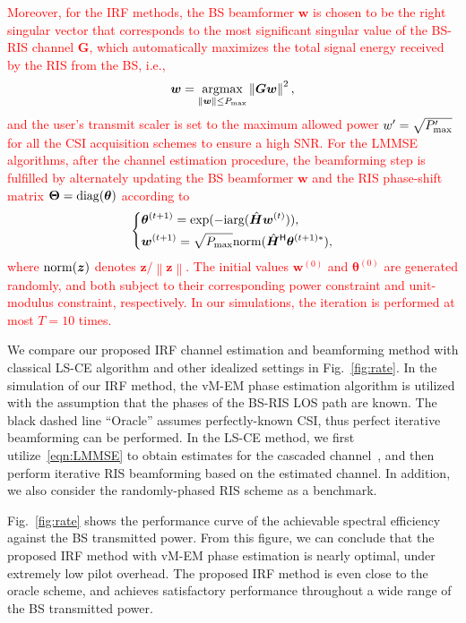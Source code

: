 \documentclass[journal,twocolumn]{IEEEtran}
\theoremstyle{nonumberplain}
\def \exp {\text{exp}}
\def \arg {\text{arg}}
\def \H {^{\mathsf{H}}}
\def \ri {{\rm i}}
\newcommand{\red}[1]{\textcolor{red}{#1}}
\begin{document}
    \red{
    Moreover, for the IRF methods, the BS beamformer $\bm w$ is chosen to be the right singular vector that corresponds to the most significant singular value of the BS-RIS channel $\bm G$, which automatically maximizes the total signal energy received by the RIS from the BS, i.e., 
    \begin{equation}
        {\bm w} = \underset{\left\|{\bm w}\right\|\leq P_{\rm max}}{\rm argmax}\left\|{\bm G}{\bm w} \right\|^2,
    \end{equation}
    and the user's transmit scaler is set to the maximum allowed power $w'=\sqrt{P'_{\rm max}}$ for all the CSI acquisition schemes to ensure a high SNR. 
    For the LMMSE algorithms, after the channel estimation procedure, the beamforming step is fulfilled by alternately updating the BS beamformer $\bm w$ and the RIS phase-shift matrix $\bm\Theta = {\rm diag}({\bm \theta})$ according to  
    \begin{equation}
        \left\{\begin{aligned}
            & {\bm \theta}^{(t+1)} = \exp(-\ri \arg(\hat{\bm H}{\bm w}^{(t)})), \\
            & {\bm w}^{(t+1)} = \sqrt{P_{\rm max}}{\rm norm}(\hat{\bm H}\H {\bm \theta}^{(t+1)*}),
        \end{aligned}\right.
    \end{equation}
    where ${\rm norm}({\bm z})$ denotes ${\bm z}/\left\|{\bm z}\right\|$. The initial values ${\bm w}^{(0)}$ and ${\bm\theta}^{(0)}$ are generated randomly, and both subject to their corresponding power constraint and unit-modulus constraint, respectively. In our simulations, the iteration is performed at most $T=10$ times. 
    }
    

    We compare our proposed \ac{IRF} channel estimation and beamforming method with classical LS-CE algorithm and other idealized settings in Fig.~\ref{fig:rate}. 
    In the simulation of our IRF method, the vM-EM phase estimation algorithm is utilized with the assumption that the phases of the BS-RIS \ac{LOS} path are known. 
    The black dashed line ``Oracle'' assumes perfectly-known CSI, thus perfect iterative beamforming can be performed. 
    In the LS-CE method, we first utilize~\eqref{eqn:LMMSE} to obtain estimates for the cascaded channel~\cite{kundu2021channel,wei2021channel}, and then perform iterative RIS beamforming based on the estimated channel. 
    In addition, we also consider the randomly-phased RIS scheme as a benchmark.  

    Fig.~\ref{fig:rate} shows the performance curve of the achievable spectral efficiency against the BS transmitted power. From this figure, we can conclude that the proposed IRF method with vM-EM phase estimation is nearly optimal, under extremely low pilot overhead. The proposed IRF method is even close to the oracle scheme, and achieves satisfactory performance throughout a wide range of the BS transmitted power. 
\end{document}
